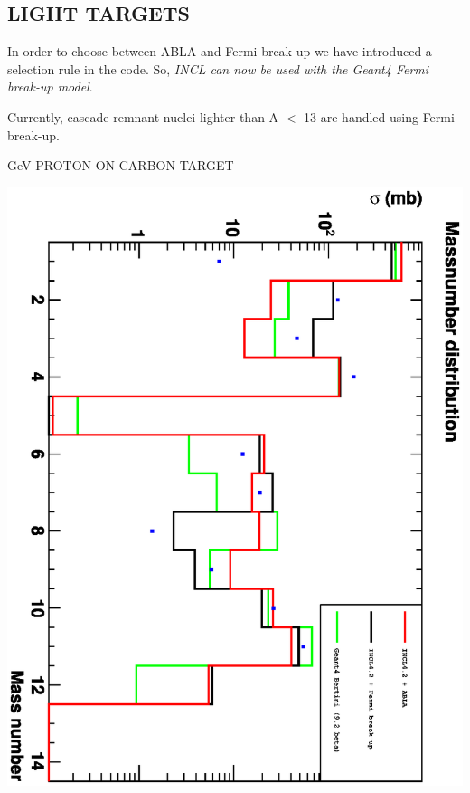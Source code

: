\documentclass[20pt]{article}
\newenvironment{textbox}
{\begin{lrbox}{\dummybox}\begin{minipage}{0.9\columnwidth}}
{\end{minipage}\end{lrbox}\raisebox{-\depth}{\psshadowbox[framesep=1em,framearc=.1,shadow=true]{\usebox{\dummybox}}}\vspace{0.005\textheight}}
\begin{document}
\begin{center}
\begin{multicols}{3}
\begin{textbox}
\section*{{\Huge {\sf LIGHT TARGETS}}}

{\color{udsect}
In order to choose between ABLA and Fermi break-up we have
introduced a selection rule in the code. 
So, \emph{{\sf INCL} can now be used with the {\sf Geant4} Fermi break-up model}.
}

\vspace{1cm}
Currently, cascade remnant nuclei lighter than A $<$ 13 are handled using Fermi break-up.

\end{textbox}

\begin{center}
{\Huge { GeV PROTON  ON CARBON TARGET}}

\vspace{1cm}
\includegraphics[scale=0.67,angle=90]{images/masses.eps}
\end{center}


\end{multicols}
\end{center}
\end{document}
